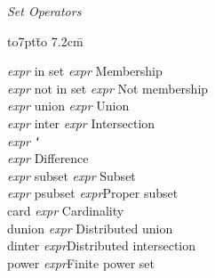 \documentclass[a4paper]{jsarticle}
\newcommand{\K}[1]{{\sf #1}}
\newcommand{\id}[1]{{\it #1\/}}
\newcommand{\backsl}{{\tt\char`\\}}
\newenvironment{tabbingone}[0]{
\begingroup
  \parskip=0pt
  \topsep=0pt
  \partopsep=0pt
  \begin{tabbing}
    \hbox to7pt{}\=%
    \hbox to 7.2cm{}\=%
    \kill
    \+ %
    \kill
}{
  \end{tabbing}
\endgroup}
\begin{document}
\id{Set Operators} 
\begin{tabbingone}
   \id{expr} \K{in} \K{set} \id{expr}\> Membership \\%
   \id{expr} \K{not} \K{in} \K{set} \id{expr}\> Not membership \\%
   \id{expr} \K{union} \id{expr}\> Union \\%
   \id{expr} \K{inter} \id{expr}\> Intersection \\%
   \id{expr} \backsl{} \id{expr}\> Difference \\%
   \id{expr} \K{subset} \id{expr}\> Subset     \\%
   \id{expr} \K{psubset} \id{expr}\>Proper subset \\%
   \K{card} \id{expr}\> Cardinality\\%
   \K{dunion} \id{expr}\> Distributed union\\%
   \K{dinter} \id{expr}\>Distributed intersection\\%
  \K{power} \id{expr}\>Finite power set\\%
\end{tabbingone}
\end{document}
